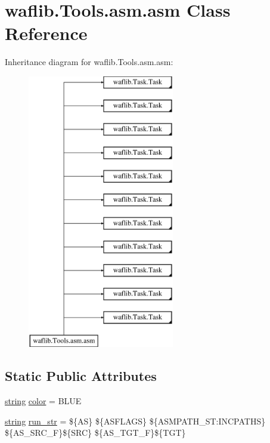 \hypertarget{classwaflib_1_1_tools_1_1asm_1_1asm}{}\section{waflib.\+Tools.\+asm.\+asm Class Reference}
\label{classwaflib_1_1_tools_1_1asm_1_1asm}
Inheritance diagram for waflib.\+Tools.\+asm.\+asm\+:\begin{figure}[H]
\begin{center}
\leavevmode
\includegraphics[height=12.000000cm]{classwaflib_1_1_tools_1_1asm_1_1asm}
\end{center}
\end{figure}
\subsection*{Static Public Attributes}
\begin{DoxyCompactItemize}
\item 
\hyperlink{test__lib_f_l_a_c_2format_8c_ab02026ad0de9fb6c1b4233deb0a00c75}{string} \hyperlink{classwaflib_1_1_tools_1_1asm_1_1asm_ad677372e6c1acb52d3cb18a416757bfb}{color} = \textquotesingle{}B\+L\+UE\textquotesingle{}
\item 
\hyperlink{test__lib_f_l_a_c_2format_8c_ab02026ad0de9fb6c1b4233deb0a00c75}{string} \hyperlink{classwaflib_1_1_tools_1_1asm_1_1asm_a80967e9b1e79690cdbce0e1797210e82}{run\+\_\+str} = \textquotesingle{}\$\{AS\} \$\{A\+S\+F\+L\+A\+GS\} \$\{A\+S\+M\+P\+A\+T\+H\+\_\+\+S\+T\+:\+I\+N\+C\+P\+A\+T\+HS\} \$\{A\+S\+\_\+\+S\+R\+C\+\_\+F\}\$\{S\+RC\} \$\{A\+S\+\_\+\+T\+G\+T\+\_\+F\}\$\{T\+GT\}\textquotesingle{}
\end{DoxyCompactItemize}
